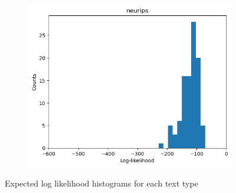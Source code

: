 \begin{figure}
\begin{subfigure}{0.3\textwidth}
    \end{subfigure}
    \begin{subfigure}{0.3\textwidth}
        \includegraphics[width=\linewidth]{./figures/neurips}
    \end{subfigure}
    \caption{Expected log likelihood histograms for each text type}
    \label{fig:ll}
\end{figure}